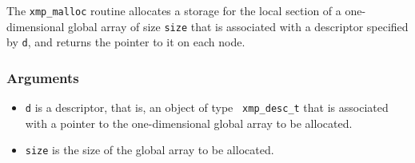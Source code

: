 The {\tt xmp\_malloc} routine allocates a storage for the local section
of a one-dimensional global array of size {\tt size} that is associated
with a descriptor specified by {\tt d}, and returns the pointer to it on
each node.

\subsubsection*{Arguments}

\begin{itemize}
 \item {\tt d} is a descriptor, that is, an object of type {\tt
       xmp\_desc\_t} that is associated with a pointer to the
       one-dimensional global array to be allocated.
 \item {\tt size} is the size of the global array to be allocated.
\end{itemize}

